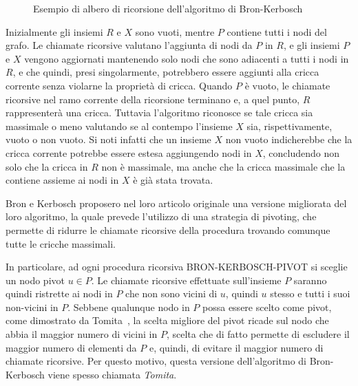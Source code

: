 \begin{figure}[t]
    \centering
    
    \caption{Esempio di albero di ricorsione dell'algoritmo di Bron-Kerbosch}
    \label{fig:bron_kerbosh_tree_example}
\end{figure}

Inizialmente gli insiemi $R$ e $X$ sono vuoti, mentre $P$ contiene tutti i nodi del grafo.
Le chiamate ricorsive valutano l'aggiunta di nodi da $P$ in $R$, e gli insiemi $P$ e $X$ vengono aggiornati
mantenendo solo nodi che sono adiacenti a tutti i nodi in $R$, e che quindi, presi singolarmente, potrebbero
essere aggiunti alla cricca corrente senza violarne la propriet\`a di cricca.
Quando $P$ è vuoto, le chiamate ricorsive nel ramo corrente della ricorsione terminano e, a quel punto,
$R$ rappresenterà una cricca.
Tuttavia l'algoritmo riconosce se tale cricca sia massimale o meno valutando se al contempo l'insieme $X$ sia,
rispettivamente, vuoto o non vuoto.
Si noti infatti che un insieme $X$ non vuoto indicherebbe che la cricca corrente potrebbe essere estesa aggiungendo
nodi in $X$, concludendo non solo che la cricca in $R$ non è massimale, ma anche che la cricca massimale che
la contiene assieme ai nodi in $X$ è gi\`a stata trovata. \newline


Bron e Kerbosch proposero nel loro articolo originale una versione migliorata del loro algoritmo, la quale
prevede l'utilizzo di una strategia di pivoting, che permette di ridurre le chiamate ricorsive della procedura
trovando comunque tutte le cricche massimali.



In particolare, ad ogni procedura ricorsiva BRON-KERBOSCH-PIVOT si sceglie un nodo pivot $u \in P$.
Le chiamate ricorsive effettuate sull'insieme $P$ saranno quindi ristrette ai nodi in $P$ che non sono vicini di $u$,
quindi $u$ stesso e tutti i suoi non-vicini in $P$.
Sebbene qualunque nodo in $P$ possa essere scelto come pivot, come dimostrato da Tomita~\cite{TOMITA200628},
la scelta migliore del pivot ricade sul nodo che abbia il maggior numero di vicini in $P$, scelta che di fatto
permette di escludere il maggior numero di elementi da $P$ e, quindi, di evitare il maggior numero di chiamate ricorsive.
Per questo motivo, questa versione dell'algoritmo di Bron-Kerbosch viene spesso chiamata \textit{Tomita}. \newline


